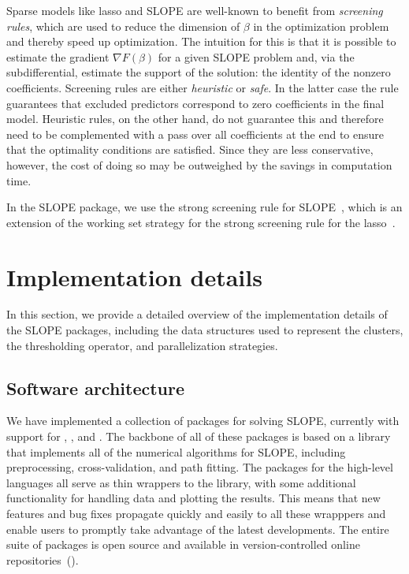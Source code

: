 \documentclass[article]{jss}
\let\Cref\crtCref
\begin{document}
Sparse models like lasso and SLOPE are well-known to benefit from
\emph{screening rules}, which are used to reduce the dimension of \(\beta\) in
the optimization problem and thereby speed up optimization. The intuition for
this is that it is possible to estimate the gradient \(\nabla F(\beta) \) for a
given SLOPE problem and, via the subdifferential, estimate the support of the
solution: the identity of the nonzero coefficients. Screening rules are
either \emph{heuristic} or \emph{safe}. In the latter case the rule guarantees that
excluded predictors correspond to zero coefficients in the final model. Heuristic
rules, on the other hand, do not guarantee this and therefore need to be
complemented with a pass over all coefficients at the end to ensure that the
optimality conditions are satisfied. Since they are less conservative, however,
the cost of doing so may be outweighed by the savings in computation
time.

In the SLOPE package, we use the strong screening rule for
SLOPE~\citep{larsson2020a}, which is an extension of the working set strategy
for the strong screening rule for the lasso~\citep{tibshirani2012}.

\section{Implementation details}
\label{sec:implementation-details}

In this section, we provide a detailed overview of the implementation
details of the SLOPE packages, including the data structures used to represent
the clusters, the thresholding operator, and parallelization strategies.

\subsection{Software architecture}
\label{sec:software}

We have implemented a collection of packages for solving SLOPE, currently with
support for , , and . The backbone
of all of these packages is based on a  library that implements
all of the numerical algorithms for SLOPE, including preprocessing,
cross-validation, and path fitting. The packages for the high-level languages
all serve as thin wrappers to the  library, with some additional
functionality for handling data and plotting the results. This means that new
features and bug fixes propagate quickly and easily to all these wrapppers and
enable users to promptly take advantage of the latest developments. The entire
suite of packages is open source and available in version-controlled
online repositories~(\Cref{tab:slope-packages}).
\end{document}
